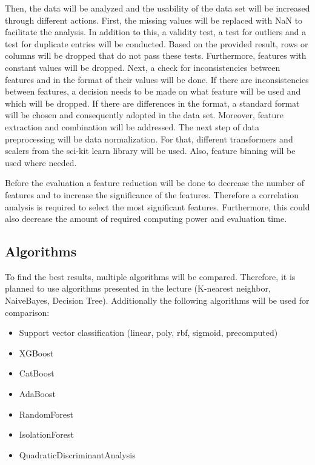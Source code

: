 \documentclass[11pt,titlepage,oneside,openany]{book}
\begin{document}
Then, the data will be analyzed and the usability of the data set will be increased through different actions. 
First, the missing values will be replaced with NaN to facilitate the analysis.
In addition to this, a validity test, a test for outliers and a test for duplicate entries will be conducted. Based on the provided result, rows or columns will be dropped that do not pass these tests. Furthermore, features with constant values will be dropped. 
Next, a check for inconsistencies between features and in the format of their values will be done. If there are inconsistencies between features, a decision needs to be made on what feature will be used and which will be dropped. If there are differences in the format, a standard format will be chosen and consequently adopted in the data set.
Moreover, feature extraction and combination will be addressed. 
The next step of data preprocessing will be data normalization. For that, different transformers and scalers from the sci-kit learn library will be used. Also, feature binning will be used where needed. 

Before the evaluation a feature reduction will be done to decrease the number of features and to increase the significance of the features. Therefore a correlation analysis is required to select the most significant features. Furthermore, this could also decrease the amount of required computing power and evaluation time. 

\subsection{Algorithms}

To find the best results, multiple algorithms will be compared. Therefore, it is planned to use algorithms presented in the lecture (K-nearest neighbor, NaiveBayes, Decision Tree). Additionally the following algorithms will be used for comparison:

\begin{itemize}
	\item Support vector classification (linear, poly, rbf, sigmoid, precomputed)
	\item XGBoost
	\item CatBoost
	\item AdaBoost
	\item RandomForest
	\item IsolationForest
	\item QuadraticDiscriminantAnalysis
\end{itemize}
\end{document}
